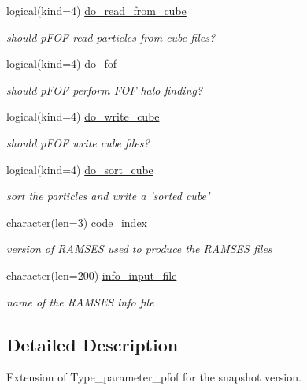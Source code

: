 \begin{DoxyCompactItemize}
logical(kind=4) \hyperlink{structmodconstant_1_1type__parameter__pfof__snap_a2eda60cfcb05e14b859d4912c4301700}{do\-\_\-read\-\_\-from\-\_\-cube}
\begin{DoxyCompactList}\small\item\em should p\-F\-O\-F read particles from cube files? \end{DoxyCompactList}\item 
logical(kind=4) \hyperlink{structmodconstant_1_1type__parameter__pfof__snap_acb40ca8aaf934ee56cf5233d3bca0be0}{do\-\_\-fof}
\begin{DoxyCompactList}\small\item\em should p\-F\-O\-F perform F\-O\-F halo finding? \end{DoxyCompactList}\item 
logical(kind=4) \hyperlink{structmodconstant_1_1type__parameter__pfof__snap_a3080ade093c18c757c10ee8b18b03db0}{do\-\_\-write\-\_\-cube}
\begin{DoxyCompactList}\small\item\em should p\-F\-O\-F write cube files? \end{DoxyCompactList}\item 
logical(kind=4) \hyperlink{structmodconstant_1_1type__parameter__pfof__snap_a69d97a99b9550658ab3d32d614591afd}{do\-\_\-sort\-\_\-cube}
\begin{DoxyCompactList}\small\item\em sort the particles and write a 'sorted cube' \end{DoxyCompactList}\item 
character(len=3) \hyperlink{structmodconstant_1_1type__parameter__pfof__snap_a08a341a76feda6a632e6ff16050c7e3e}{code\-\_\-index}
\begin{DoxyCompactList}\small\item\em version of R\-A\-M\-S\-E\-S used to produce the R\-A\-M\-S\-E\-S files \end{DoxyCompactList}\item 
character(len=200) \hyperlink{structmodconstant_1_1type__parameter__pfof__snap_a0337983bc6b424f1291afffd5f318eae}{info\-\_\-input\-\_\-file}
\begin{DoxyCompactList}\small\item\em name of the R\-A\-M\-S\-E\-S info file \end{DoxyCompactList}\end{DoxyCompactItemize}


\subsection{Detailed Description}
Extension of Type\-\_\-parameter\-\_\-pfof for the snapshot version. 

